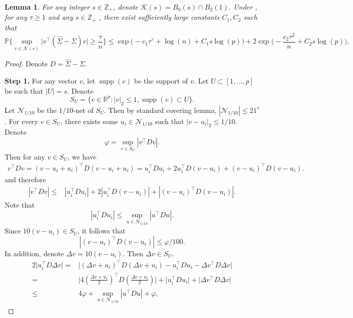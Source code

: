 \documentclass[11pt]{article}
\newcommand{\p}{\mathbb P}
\DeclareMathOperator*{\supp}{supp}
\theoremstyle{plain}
\newtheorem{lemma}[theorem]{Lemma}
\theoremstyle{definition}
\begin{document}
\begin{lemma}\label{lemma:RES step 2}For any integer $s\in \mathbb Z_+$,  denote  
  $   \mathcal K(s) = B_0(s) \cap B_2(1) .   $
  Under   ,
   for any $\tau\ge  1$ and  any   $s\in \mathbb Z_+ $    , there exist  sufficiently large constants
    $C_1, C_2$ such that  
$$ \p\bigg\{  \sup_{v \in \mathcal K(s) } \bigg| v^\top (\widehat \Sigma - \Sigma ) v\bigg| \ge     \frac{\tau}{n }  \bigg\} 
\le    \exp\Big(-c_1  \tau ^{\gamma} +\log(n)+C _1s\log(p) \Big) + 2 \exp\Big(-\frac{c_2 \tau ^2}{ n   }  +C_2 s\log(p)  \Big)  ,
$$ 

\end{lemma}
\begin{proof} Denote $ D= \widehat \Sigma - \Sigma .$

{\bf Step 1.}   
  For any vector $v$, let  $ \supp(v)$ be the support of $v$.  Let $U \subset[1,\ldots, p] $ be such that $|U| =  s$.  
Denote 
$$ S_U = \{ v \in \mathbb R^p:  |v |_2 \le 1, \supp(v) \subset U  \}.$$ 
Let $\mathcal N_{1/10}$ be the $1/10$-net of $S_U$. Then by standard covering lemma, $|\mathcal N_{1/10} | \le 21^s $. For every 
$v\in S_U$, there exists some $u_i\in \mathcal N_{1/10}$ such that $ |  v- u_i  |_2 \le 1/10 $.
Denote 
$$ \varphi = \sup_{v \in S_U} | v^\top D v|.$$
Then for  any
$v\in S_U$, we have 
\begin{align*}
 v^\top Dv = (v -u_i+u_i)^\top D(v -u_i+u_i)  =    u_i^\top D u_i  +2     u_i^\top D (v - u_i)    +  (v - u_i) ^\top D  (v - u_i)  .
\end{align*}
and therefore 
\begin{align*}
| v^\top Dv| \le& | u_i^\top D u_i |+2  |  u_i^\top D (v - u_i) |  + |(v - u_i) ^\top D  (v - u_i) |.
\end{align*}
Note that 
$$
  | u_i^\top D u_i | \le \sup_{ u \in  \mathcal N_{1/10 }} |u^\top D u|  .$$
Since 
$ 10 (v-u_i ) \in S_U$, it follows that 
$$|(v - u_i) ^\top D  (v - u_i) |\le \varphi/100. $$
In addition, denote $\Delta v  = 10( v - u_i) $. Then   $  \Delta v \in S_U$. 
\begin{align*}
   2\bigg| u_i^\top D \Delta v   \bigg|  =  &  \bigg|    ( \Delta v +u_i)   ^\top D   (\Delta v+u_i)      -  u_i ^\top Du_i  -  \Delta v ^\top D \Delta v \bigg| 
  \\= &  \bigg|  4  (  \frac{ \Delta v +u_i}{2 })   ^\top D   ( \frac{ \Delta v +u_i}{2 } )  \bigg|     + \bigg|   u_i ^\top Du_i   \bigg|  +  \bigg|   \Delta v ^\top D \Delta v   \bigg| 
  \\
  \le & 4 \varphi + \sup_{ u \in  \mathcal N_{1/10 }} |u^\top D u|   + \varphi, 

\end{align*}
\end{proof}
\end{document}

